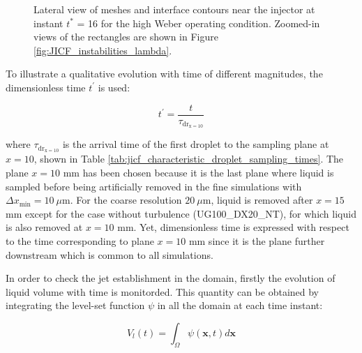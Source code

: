 \begin{figure}[ht]
\centering
	\centering
\caption[Lateral view of meshes and interface contours near the injector at instant $t^{*}$ = 15 for the high Weber operating condition.]{Lateral view of meshes and interface contours near the injector at instant $t^{*}$ = 16 for the high Weber operating condition. Zoomed-in views of the rectangles are shown in Figure \ref{fig:JICF_instabilities_lambda}.}
\label{fig:JICF_w_mesh}
\end{figure}

To illustrate a qualitative evolution with time of different magnitudes, the dimensionless time $t^{\prime} $ is used:

\begin{equation}
\label{eq:t_prime_with_tau_drx10}
t^{\prime} = \frac{t}{\tau_\mathrm{dr_{x=10}}}
\end{equation}

where $\tau_\mathrm{dr_{x=10}}$ is the arrival time of the first droplet to the sampling plane at $x = 10$, shown in Table \ref{tab:jicf_characteristic_droplet_sampling_times}. The plane $x = 10$ mm has been chosen because it is the last plane where liquid is sampled before being artificially removed in the fine simulations with $\Delta x_\mathrm{min} = 10 ~\mu$m. For the coarse resolution $20 ~\mu$m, liquid is removed after $x = 15$ mm except for the case without turbulence (UG100\_DX20\_NT), for which liquid is also removed at $x = 10$ mm. Yet, dimensionless time is expressed with respect to the time corresponding to plane $x = 10$ mm since it is the plane further downstream which is common to all simulations. 

In order to check the jet establishment in the domain, firstly the evolution of liquid volume with time is monitorded. This quantity can be obtained by integrating the level-set function $\psi$ in all the domain at each time instant:

\begin{equation}
\label{eq:liquid_volume_from_levelset_definition}
V_l \left ( t \right) = \int_{\Omega} \psi \left( \textbf{x}, t \right) d\textbf{x}
\end{equation}

